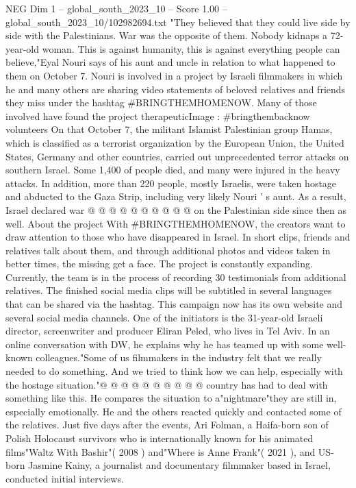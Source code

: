 \begin{textsample}{NEG Dim 1 – global\_south\_2023\_10 – Score 1.00 – global\_south\_2023\_10/102982694.txt}  \label{ex:f1_neg_401}
"They believed that they could live side by side with the Palestinians.
War was the opposite of them.
Nobody kidnaps a 72-year-old woman.
This is against humanity, this is against everything people can believe,"Eyal Nouri says of his aunt and uncle in relation to what happened to them on October 7.
Nouri is involved in a project by Israeli filmmakers in which he and many others are sharing video statements of beloved relatives and friends they miss under the hashtag \#BRINGTHEMHOMENOW.
Many of those involved have found the project therapeuticImage : \#bringthembacknow volunteers On that October 7, the militant Islamist Palestinian group Hamas, which is classified as a terrorist organization by the European Union, the United States, Germany and other countries, carried out unprecedented terror attacks on southern Israel.
Some 1,400 of people died, and many were injured in the heavy attacks.
In addition, more than 220 people, mostly Israelis, were taken hostage and abducted to the Gaza Strip, including very likely Nouri ' s aunt.
As a result, Israel declared war @ @ @ @ @ @ @ @ @ @ on the Palestinian side since then as well.
About the project With \#BRINGTHEMHOMENOW, the creators want to draw attention to those who have disappeared in Israel.
In short clips, friends and relatives talk about them, and through additional photos and videos taken in better times, the missing get a face.
The project is constantly expanding.
Currently, the team is in the process of recording 30 testimonials from additional relatives.
The finished social media clips will be subtitled in several languages that can be shared via the hashtag.
This campaign now has its own website and several social media channels.
One of the initiators is the 31-year-old Israeli director, screenwriter and producer Eliran Peled, who lives in Tel Aviv.
In an online conversation with DW, he explains why he has teamed up with some well-known colleagues."Some of us filmmakers in the industry felt that we really needed to do something.
And we tried to think how we can help, especially with the hostage situation."@ @ @ @ @ @ @ @ @ @ country has had to deal with something like this.
He compares the situation to a"nightmare"they are still in, especially emotionally.
He and the others reacted quickly and contacted some of the relatives.
Just five days after the events, Ari Folman, a Haifa-born son of Polish Holocaust survivors who is internationally known for his animated films"Waltz With Bashir"( 2008 ) and"Where is Anne Frank"( 2021 ), and US-born Jasmine Kainy, a journalist and documentary filmmaker based in Israel, conducted initial interviews.

\end{textsample}
